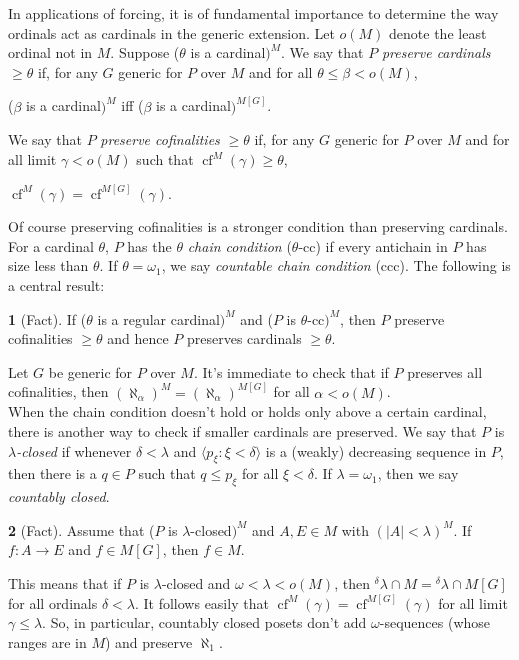 \documentclass[11pt,a4paper]{report}
\theoremstyle{definition}
\theoremstyle{num.custom-title}
\theoremstyle{custom-title}
\newtheorem*{teo_custom-title_nonum}{}
\DeclareMathOperator{\cf}{cf}
\begin{document}
In applications of forcing, it is of fundamental importance to determine the way ordinals act as cardinals in the generic extension. Let $o(M)$ denote the least ordinal not in $M$. Suppose ($\theta$ is a cardinal$)^M$. We say that $P$ \emph{preserve cardinals} $\geq \theta$ if, for any $G$ generic for $P$ over $M$ and for all $\theta \leq \beta < o(M)$,
\begin{center}
($\beta$ is a cardinal$)^M$ iff ($\beta$ is a cardinal$)^{M[G]}$.
\end{center}
We say that $P$ \emph{preserve cofinalities} $\geq \theta$ if, for any $G$ generic for $P$ over $M$ and for all limit $\gamma < o(M)$ such that $\cf^M (\gamma) \geq \theta$,
\begin{center}
$\cf^M (\gamma) = \cf^{M[G]} (\gamma)$.
\end{center}
Of course preserving cofinalities is a stronger condition than preserving cardinals.\\
For a cardinal $\theta$, $P$ has the $\theta$ \emph{chain condition} ($\theta$-cc) if every antichain in $P$ has size less than $\theta$. If $\theta=\omega_1$, we say \emph{countable chain condition} (ccc). The following is a central result:
\begin{teo_custom-title_nonum}[Fact]
If ($\theta$ is a regular cardinal$)^M$ and ($P$ is $\theta$-cc$)^M$, then $P$ preserve cofinalities $\geq \theta$ and hence $P$ preserves cardinals $\geq \theta$.
\end{teo_custom-title_nonum}
Let $G$ be generic for $P$ over $M$. It's immediate to check that if $P$ preserves all cofinalities, then $(\aleph_\alpha)^M = (\aleph_\alpha)^{M[G]}$ for all $\alpha < o(M)$.\\
When the chain condition doesn't hold or holds only above a certain cardinal, there is another way to check if smaller cardinals are preserved. We say that $P$ is \emph{$\lambda$-closed} if whenever $\delta < \lambda$ and $\langle p_\xi : \xi < \delta \rangle$ is a (weakly) decreasing sequence in $P$, then there is a $q \in P$ such that $q \leq p_\xi$ for all $\xi < \delta$. If $\lambda=\omega_1$, then we say \emph{countably closed}.
\begin{teo_custom-title_nonum}[Fact]
Assume that ($P$ is $\lambda$-closed$)^M$ and $A,E \in M$ with $(|A| < \lambda)^M$. If $f \colon A \to E$ and $f \in M[G]$, then $f \in M$.
\end{teo_custom-title_nonum}
This means that if $P$ is $\lambda$-closed and $\omega < \lambda < o(M)$, then ${}^\delta \lambda \cap M = {}^\delta \lambda \cap M[G]$ for all ordinals $\delta < \lambda$. It follows easily that $\cf^M(\gamma) = \cf^{M[G]}(\gamma)$ for all limit $\gamma \leq \lambda$. So, in particular, countably closed posets don't add $\omega$-sequences (whose ranges are in $M$) and preserve $\aleph_1$.
\end{document}
